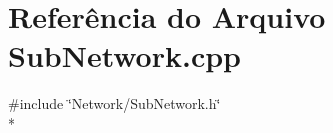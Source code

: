 \section{Referência do Arquivo Sub\+Network.\+cpp}
\label{_sub_network_8cpp}
{\ttfamily \#include \char`\"{}Network/\+Sub\+Network.\+h\char`\"{}}\\*
